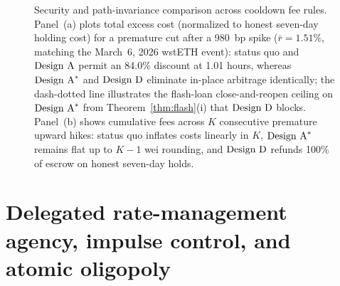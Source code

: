 \begin{figure}[t]
\caption{Security and path-invariance comparison across cooldown fee rules. Panel~(a) plots total excess cost (normalized to honest seven-day holding cost) for a premature cut after a 980~bp spike ($\bar{r} = 1.51\%$, matching the March~6, 2026 wstETH event): status quo and $\textup{Design A}$ permit an 84.0\% discount at 1.01 hours, whereas $\textup{Design A}^*$ and $\textup{Design D}$ eliminate in-place arbitrage identically; the dash-dotted line illustrates the flash-loan close-and-reopen ceiling on $\textup{Design A}^*$ from Theorem~\ref{thm:flash}(i) that $\textup{Design D}$ blocks. Panel~(b) shows cumulative fees across $K$ consecutive premature upward hikes: status quo inflates costs linearly in $K$, $\textup{Design A}^*$ remains flat up to $K - 1$ wei rounding, and $\textup{Design D}$ refunds 100\% of escrow on honest seven-day holds.}
\label{fig:mechanisms}
\end{figure}

\section{Delegated rate-management agency, impulse control, and atomic oligopoly}\label{sec:agency}

